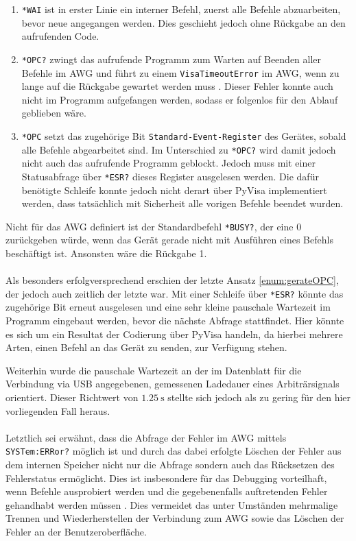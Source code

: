 \documentclass[../Report.tex]{subfiles}
\begin{document}
\begin{enumerate}

	\item \lstinline{*WA}\lstinline{I} ist in erster Linie ein interner Befehl, zuerst alle Befehle abzuarbeiten, bevor neue angegangen werden. Dies geschieht jedoch ohne Rückgabe an den aufrufenden Code.
	
	\item \lstinline{*OPC?} zwingt das aufrufende Programm zum Warten auf Beenden aller Befehle im AWG und führt zu einem \lstinline{VisaTimeoutError} im AWG, wenn zu lange auf die Rückgabe gewartet werden muss \cite[S. 9]{troeser13}. Dieser Fehler konnte auch nicht im Programm aufgefangen werden, sodass er folgenlos für den Ablauf geblieben wäre.
	
	\item \label{enum:gerateOPC}\lstinline{*OPC} setzt das zugehörige Bit \lstinline{Standard-Event-Register} des Gerätes, sobald alle Befehle abgearbeitet sind. Im Unterschied zu \lstinline{*OPC?} wird damit jedoch nicht auch das aufrufende Programm geblockt. Jedoch muss mit einer Statusabfrage über \lstinline{*ESR?} dieses Register ausgelesen werden. Die dafür benötigte Schleife konnte jedoch nicht derart über PyVisa implementiert werden, dass tatsächlich mit Sicherheit alle vorigen Befehle beendet wurden.

\end{enumerate}

Nicht für das AWG definiert ist der Standardbefehl \lstinline{*BU}\lstinline{SY?}, der eine 0 zurückgeben würde, wenn das Gerät gerade nicht mit Ausführen eines Befehls beschäftigt ist. Ansonsten wäre die Rückgabe 1.
\\
\\
Als besonders erfolgversprechend erschien der letzte Ansatz \ref{enum:gerateOPC}, der jedoch auch zeitlich der letzte war. Mit einer Schleife über \lstinline{*ES}\lstinline{R?} könnte das zugehörige Bit erneut ausgelesen und eine sehr kleine pauschale Wartezeit im Programm eingebaut werden, bevor die nächste Abfrage stattfindet. Hier könnte es sich um ein Resultat der Codierung über PyVisa handeln, da hierbei mehrere Arten, einen Befehl an das Gerät zu senden, zur Verfügung stehen.

Weiterhin wurde die pauschale Wartezeit an der im Datenblatt \cite[S. 21]{keysData14} für die Verbindung via USB angegebenen, gemessenen Ladedauer eines Arbiträrsignals orientiert. Dieser Richtwert von $\SI{1.25}{\s}$ stellte sich jedoch als zu gering für den hier vorliegenden Fall heraus.
\\
\\
Letztlich sei erwähnt, dass die Abfrage der Fehler im AWG mittels  \lstinline{SYSTem:ERRor?} möglich ist und durch das dabei erfolgte Löschen der Fehler aus dem internen Speicher nicht nur die Abfrage sondern auch das Rücksetzen des Fehlerstatus ermöglicht. Dies ist insbesondere für das Debugging vorteilhaft, wenn Befehle ausprobiert werden und die gegebenenfalls auftretenden Fehler gehandhabt werden müssen \cite[S. 454]{keysHand15}. Dies vermeidet das unter Umständen mehrmalige Trennen und Wiederherstellen der Verbindung zum AWG sowie das Löschen der Fehler an der Benutzeroberfläche.
\end{document}

